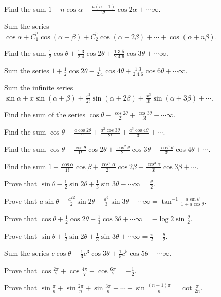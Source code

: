 \item Find the sum $1 + n\cos\alpha + \frac{n(n + 1)}{2!}\cos2\alpha + \cdots \infty$.
\item Sum the series $\cos\alpha + C_1^^n\cos(\alpha + \beta) + C_2^^n\cos(\alpha + 2\beta) + \cdots +
  \cos(\alpha + n\beta)$.
\item Find the sum $\frac{1}{2}\cos\theta + \frac{1.3}{2.4}\cos2\theta + \frac{1.3.5}{2.4.6}\cos3\theta +
  \cdots \infty$.
\item Sum the series $1 + \frac{1}{2}\cos2\theta - \frac{1}{2.4}\cos4\theta + \frac{1.3}{2.4.6}\cos6\theta +
  \cdots \infty$.
\item Sum the infinite series $\sin\alpha + x\sin(\alpha + \beta) + \frac{x^2}{2!}\sin(\alpha + 2\beta) +
  \frac{x^3}{3!}\sin(\alpha + 3\beta) + \cdots$.
\item Find the sum of the series $\cos\theta - \frac{\cos2\theta}{2!} + \frac{\cos3\theta}{3!} - \cdots
  \infty$.
\item Find the sum $\cos\theta + \frac{a\cos2\theta}{1!} + \frac{a^2\cos3\theta}{2!} +
  \frac{a^3\cos4\theta}{3!} + \cdots$.
\item Find the sum $\cos\theta + \frac{\cos\theta}{1!}\cos2\theta + \frac{\cos^2\theta}{2!}\cos3\theta +
  \frac{\cos^3\theta}{3!}\cos4\theta + \cdots$.
\item Find the sum $1 + \frac{\cos\alpha}{1!}\cos\beta + \frac{\cos^2\alpha}{2!}\cos2\beta +
  \frac{\cos^3\alpha}{3!}\cos3\beta + \cdots$.
\item Prove that $\sin\theta - \frac{1}{2}\sin2\theta + \frac{1}{3}\sin3\theta - \cdots \infty =
  \frac{\theta}{2}$.
\item Prove that $a\sin\theta - \frac{a^22}{2}\sin2\theta + \frac{a^3}{3}\sin3\theta - \cdots \infty =
  \tan^{-1}\frac{a\sin\theta}{1 + a\cos\theta}$.
\item Prove that $\cos\theta + \frac{1}{2}\cos2\theta + \frac{1}{3}\cos3\theta + \cdots \infty =
  -\log2\sin\frac{\theta}{2}$.
\item Prove that $\sin\theta + \frac{1}{2}\sin2\theta + \frac{1}{3}\sin3\theta + \cdots \infty =
  \frac{\pi}{2} - \frac{\theta}{2}$.
\item Sum the series $c\cos\theta - \frac{1}{3}c^3\cos3\theta + \frac{1}{5}c^5\cos5\theta - \cdots \infty$.
\item Prove that $\cos\frac{2\pi}{7} + \cos\frac{4\pi}{7} + \cos\frac{6\pi}{7} = -\frac{1}{2}$.
\item Prove that $\sin\frac{\pi}{n} + \sin\frac{2\pi}{n} + \sin\frac{3\pi}{n} + \cdots + \sin\frac{(n -
    1)\pi}{n} = \cot\frac{\pi}{2n}$.
